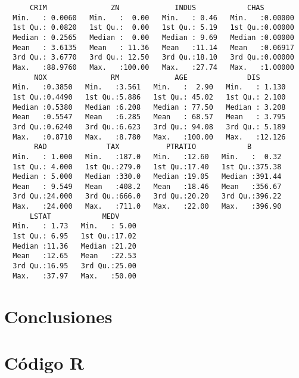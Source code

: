 \documentclass[12pt,a4paper,twoside,openright,titlepage,final]{article}
\begin{document}
\begin{verbatim}
      CRIM               ZN             INDUS            CHAS        
  Min.   : 0.0060   Min.   :  0.00   Min.   : 0.46   Min.   :0.00000  
  1st Qu.: 0.0820   1st Qu.:  0.00   1st Qu.: 5.19   1st Qu.:0.00000  
  Median : 0.2565   Median :  0.00   Median : 9.69   Median :0.00000  
  Mean   : 3.6135   Mean   : 11.36   Mean   :11.14   Mean   :0.06917  
  3rd Qu.: 3.6770   3rd Qu.: 12.50   3rd Qu.:18.10   3rd Qu.:0.00000  
  Max.   :88.9760   Max.   :100.00   Max.   :27.74   Max.   :1.00000  
       NOX               RM             AGE              DIS        
  Min.   :0.3850   Min.   :3.561   Min.   :  2.90   Min.   : 1.130  
  1st Qu.:0.4490   1st Qu.:5.886   1st Qu.: 45.02   1st Qu.: 2.100  
  Median :0.5380   Median :6.208   Median : 77.50   Median : 3.208  
  Mean   :0.5547   Mean   :6.285   Mean   : 68.57   Mean   : 3.795  
  3rd Qu.:0.6240   3rd Qu.:6.623   3rd Qu.: 94.08   3rd Qu.: 5.189  
  Max.   :0.8710   Max.   :8.780   Max.   :100.00   Max.   :12.126  
       RAD              TAX           PTRATIO            B         
  Min.   : 1.000   Min.   :187.0   Min.   :12.60   Min.   :  0.32  
  1st Qu.: 4.000   1st Qu.:279.0   1st Qu.:17.40   1st Qu.:375.38  
  Median : 5.000   Median :330.0   Median :19.05   Median :391.44  
  Mean   : 9.549   Mean   :408.2   Mean   :18.46   Mean   :356.67  
  3rd Qu.:24.000   3rd Qu.:666.0   3rd Qu.:20.20   3rd Qu.:396.22  
  Max.   :24.000   Max.   :711.0   Max.   :22.00   Max.   :396.90  
      LSTAT            MEDV      
  Min.   : 1.73   Min.   : 5.00  
  1st Qu.: 6.95   1st Qu.:17.02  
  Median :11.36   Median :21.20  
  Mean   :12.65   Mean   :22.53  
  3rd Qu.:16.95   3rd Qu.:25.00  
  Max.   :37.97   Max.   :50.00  
\end{verbatim}

\section{Conclusiones}

\newpage

\section{Código R}

%
\end{document}
